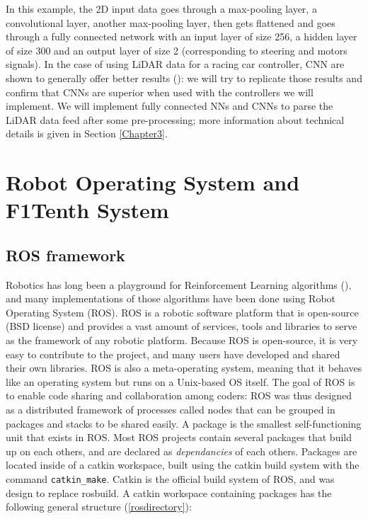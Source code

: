 In this example, the 2D input data goes through a max-pooling layer, a convolutional layer, another max-pooling layer, then gets flattened and goes through a fully connected network with an input layer of size 256, a hidden layer of size 300 and an output layer of size 2 (corresponding to steering and motors signals). \newline
In the case of using LiDAR data for a racing car controller, CNN are shown to generally offer better results (\cite{bosello}): we will try to replicate those results and confirm that CNNs are superior when used with the controllers we will implement. We will implement fully connected NNs and CNNs to parse the LiDAR data feed after some pre-processing; more information about technical details is given in Section \ref{Chapter3}.

\section{Robot Operating System and F1Tenth System}
\label{rosandf1tenth}
\subsection{ROS framework}

Robotics has long been a playground for Reinforcement Learning algorithms (\cite{rlintro}), and many implementations of those algorithms have been done using Robot Operating System (ROS). ROS is a robotic software platform that is open-source (BSD license) and provides a vast amount of services, tools and libraries to serve as the framework of any robotic platform. Because ROS is open-source, it is very easy to contribute to the project, and many users have developed and shared their own libraries. ROS is also a meta-operating system, meaning that it behaves like an operating system but runs on a Unix-based OS itself. The goal of ROS is to enable code sharing and collaboration among coders: ROS was thus designed as a distributed framework of processes called nodes that can be grouped in packages and stacks to be shared easily. A package is the smallest self-functioning unit that exists in ROS. Most ROS projects contain several packages that build up on each others, and are declared as \textit{dependancies} of each others. Packages are located inside of a catkin workspace, built using the catkin build system with the command \verb |catkin_make|. Catkin is the official build system of ROS, and was design to replace rosbuild. A catkin workspace containing packages has the following general structure (\ref{rosdirectory}):

